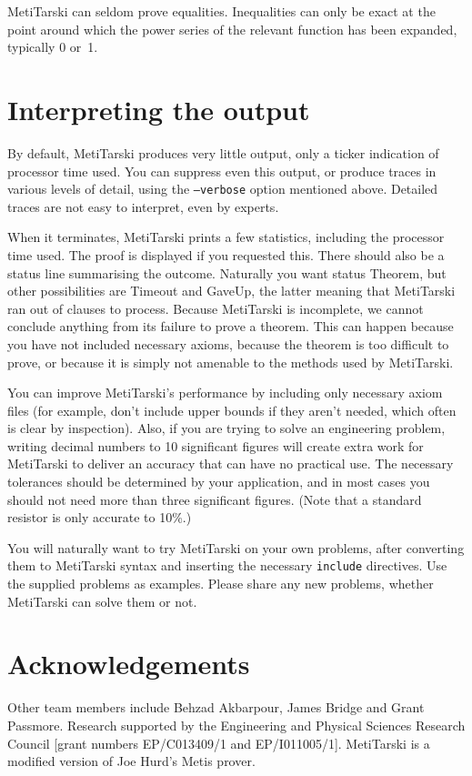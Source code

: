 \documentclass[a4paper,11pt]{scrartcl}
\begin{document}
MetiTarski can seldom prove equalities.  Inequalities can only be exact at the point
around which the power series of the relevant function has been expanded, typically
0 or~1.

\section{Interpreting the output}

By default, MetiTarski produces very little output, only a ticker indication
of processor time used. You can suppress even this output, or produce traces
in various levels of detail, using the \texttt{--verbose} option mentioned above.
Detailed traces are not easy to interpret, even by experts.

When it terminates, MetiTarski prints a few statistics, including the processor
time used. The proof is displayed if you requested this. There should also be a
status line summarising the outcome. Naturally you want status Theorem, but
other possibilities are Timeout and GaveUp, the latter meaning that MetiTarski
ran out of clauses to process. Because MetiTarski is incomplete, we cannot
conclude anything from its failure to prove a theorem. This can happen because
you have not included necessary axioms, because the theorem is too difficult to
prove, or because it is simply not amenable to the methods used by MetiTarski.

You can improve MetiTarski's performance by including only necessary axiom files
(for example, don't include upper bounds if they aren't needed, which often is
clear by inspection). Also, if you are trying to solve an engineering problem,
writing decimal numbers to 10 significant figures will create extra work for
MetiTarski to deliver an accuracy that can have no practical use. The necessary
tolerances should be determined by your application, and in most cases you
should not need more than three significant figures. (Note that a standard
resistor is only accurate to 10\%.)

You will naturally want to try MetiTarski on your own problems, after converting them
to MetiTarski syntax and inserting the necessary \texttt{include} directives. Use the
supplied problems as examples. Please share any new problems, whether
MetiTarski can solve them or not.

\section*{Acknowledgements}

Other team members include Behzad Akbarpour, James Bridge and Grant Passmore.
Research supported by the Engineering and Physical Sciences Research Council [grant numbers EP/C013409/1 and EP/I011005/1]. MetiTarski is a modified version of Joe Hurd's Metis prover.



\end{document}

